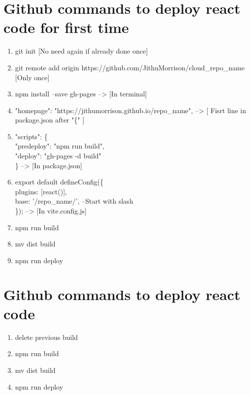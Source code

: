 \documentclass[openany]{book} %
\begin{document}
\section{Github commands to deploy react code for first time}
\begin{enumerate}
    \item git init [No need again if already done once]
    \item git remote add origin https://github.com/JithuMorrison/cloud\_repo\_name [Only once]
    \item npm install --save gh-pages   -->   [In terminal]
    \item "homepage": "https://jithumorrison.github.io/repo\_name", --> [ Fisrt line in package.json after "\{" ] \\
    \item "scripts": \{\\
  "predeploy": "npm run build",\\
  "deploy": "gh-pages -d build"\\
\} --> [In package.json] 
    \item export default defineConfig(\{\\
  plugins: [react()],\\
  base: '/repo\_name/', --Start with slash\\
\}); --> [In vite.config.js] 
    \item npm run build
    \item mv dist build
    \item npm run deploy
\end{enumerate}

\section{Github commands to deploy react code}
\begin{enumerate}
    \item delete previous build
    \item npm run build
    \item mv dist build
    \item npm run deploy
\end{enumerate}


\setlength{\columnsep}{0.75cm}
\printindex

\end{document}
